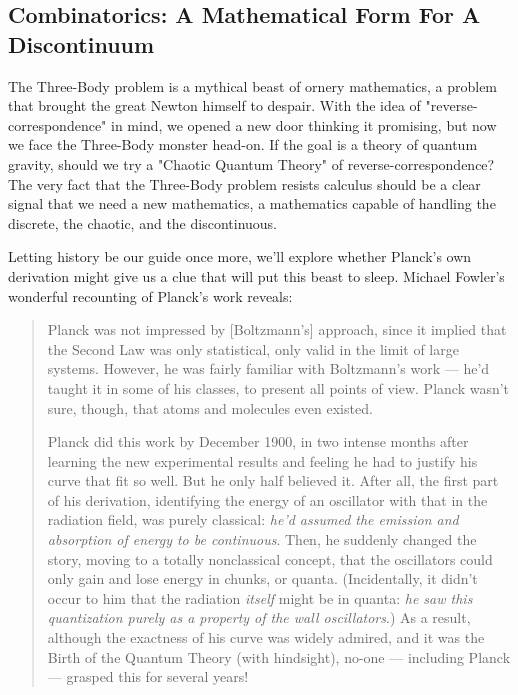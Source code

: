 \documentclass{article}
\begin{document}
\subsection*{Combinatorics: A Mathematical Form For A Discontinuum}
The Three-Body problem is a mythical beast of ornery mathematics, a problem that brought the great Newton himself to despair. With the idea of "reverse-correspondence" in mind, we opened a new door thinking it promising, but now we face the Three-Body monster head-on. If the goal is a theory of quantum gravity, should we try a "Chaotic Quantum Theory" of reverse-correspondence? The very fact that the Three-Body problem resists calculus should be a clear signal that we need a new mathematics, a mathematics capable of handling the discrete, the chaotic, and the discontinuous.

Letting history be our guide once more, we'll explore whether Planck's own derivation might give us a clue that will put this beast to sleep. Michael Fowler's wonderful recounting of Planck's work reveals: \cite{Fowler2008}

\begin{quotation}
    Planck was not impressed by [Boltzmann's] approach, since it implied that the Second Law was only statistical, only valid in the limit of large systems. However, he was fairly familiar with Boltzmann’s work — he’d taught it in some of his classes, to present all points of view. Planck wasn’t sure, though, that atoms and molecules even existed.

    Planck did this work by December 1900, in two intense months after learning the new experimental results and feeling he had to justify his curve that fit so well. But he only half believed it. After all, the first part of his derivation, identifying the energy of an oscillator with that in the radiation field, was purely classical: \textit{he’d assumed the emission and absorption of energy to be continuous}. Then, he suddenly changed the story, moving to a totally nonclassical concept, that the oscillators could only gain and lose energy in chunks, or quanta. (Incidentally, it didn’t occur to him that the radiation \textit{itself} might be in quanta: \textit{he saw this quantization purely as a property of the wall oscillators}.) As a result, although the exactness of his curve was widely admired, and it was the Birth of the Quantum Theory (with hindsight), no-one — including Planck — grasped this for several years!
\end{quotation}
\end{document}
